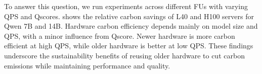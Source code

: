 
\noindent To answer this question, we run experiments across different FUs with varying QPS and Qscores.  shows the relative carbon savings of L40 and H100 servers for Qwen 7B and 14B. Hardware carbon efficiency depends mainly on model size and QPS, with a minor influence from Qscore. Newer hardware is more carbon efficient at high QPS, while older hardware is better at low QPS. These findings underscore the sustainability benefits of reusing older hardware to cut carbon emissions while maintaining performance and quality.



